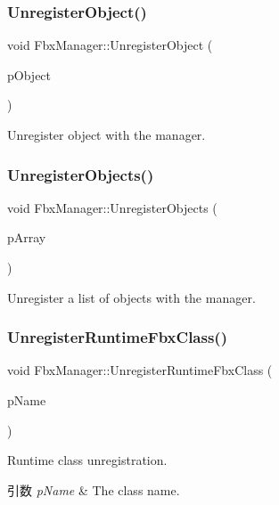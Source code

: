 \subsubsection{\texorpdfstring{Unregister\+Object()}{UnregisterObject()}}
{\footnotesize\ttfamily void Fbx\+Manager\+::\+Unregister\+Object (\begin{DoxyParamCaption}\item[{\hyperlink{class_fbx_object}{Fbx\+Object} $\ast$}]{p\+Object }\end{DoxyParamCaption})}

Unregister object with the manager. \mbox{\label{class_fbx_manager_ad0efea934848eb58488905b51aa91b38}} 
\subsubsection{\texorpdfstring{Unregister\+Objects()}{UnregisterObjects()}}
{\footnotesize\ttfamily void Fbx\+Manager\+::\+Unregister\+Objects (\begin{DoxyParamCaption}\item[{const \hyperlink{class_fbx_array}{Fbx\+Array}$<$ \hyperlink{class_fbx_object}{Fbx\+Object} $\ast$$>$ \&}]{p\+Array }\end{DoxyParamCaption})}

Unregister a list of objects with the manager. \mbox{\label{class_fbx_manager_ab46a3ccf9aa7cf28f8b2b18223baeedb}} 
\subsubsection{\texorpdfstring{Unregister\+Runtime\+Fbx\+Class()}{UnregisterRuntimeFbxClass()}}
{\footnotesize\ttfamily void Fbx\+Manager\+::\+Unregister\+Runtime\+Fbx\+Class (\begin{DoxyParamCaption}\item[{const char $\ast$}]{p\+Name }\end{DoxyParamCaption})\hspace{0.3cm}{\ttfamily [inline]}}

Runtime class unregistration. 
\begin{DoxyParams}{引数}
{\em p\+Name} & The class name. \\
\hline
\end{DoxyParams}


